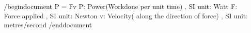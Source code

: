 /begindocument
P = Fv
P: Power(Workdone per unit time) , SI unit: Watt
F: Force applied , SI unit: Newton
v: Velocity( along the direction of force) , SI unit: metres/second
/enddocument

